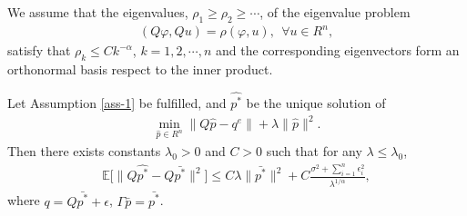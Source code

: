 \documentclass[10pt,a4paper]{amsart}
\begin{document}
\begin{assumption}\label{ass-1} We assume that the eigenvalues, $\rho_1\geq\rho_2\geq\cdots$, of the eigenvalue problem
\begin{align*}
(Q\varphi,Qu)=\rho(\varphi,u),~~\forall u\in R^n,    
\end{align*}
satisfy that $\rho_k\leq Ck^{-\alpha}$, $k=1,2,\cdots,n$ and the corresponding eigenvectors form an orthonormal basis respect to the inner product.
\end{assumption}

\begin{theorem}\label{Th-sto-1}
Let Assumption \ref{ass-1} be fulfilled, and $\hat{p^*}$ be the unique solution of 
\begin{align}\label{Q-mini-1}
\min\limits_{\hat{p}\in R^n} \|Q\hat{p}-q^e\| + \lambda\|\hat{p}\|^2.
\end{align}
Then there exists constants $\lambda_0>0$ and $C>0$ such that for any $\lambda\leq\lambda_0$,
\begin{align*}
\mathbb{E}\big[\|Q\hat{p^*}-Q\bar{p^*}\|^2\big]\leq C\lambda\|\bar{p^*}\|^2+C\frac{\sigma^2+\sum_{i=1}^n\epsilon_i^2}{\lambda^{1/\alpha}},
\end{align*}
where $q=Q\bar{p^*}+\epsilon$, $\Gamma\bar{p}=\bar{p^*}$.
\end{theorem}
\end{document}
